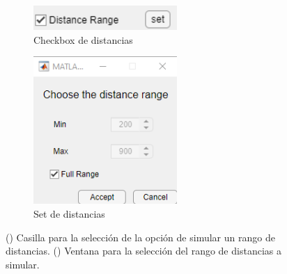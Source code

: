 		\begin{figure}[H]%
		\begin{subfigure}[b]{0.48\textwidth}
			\centering
				\includegraphics[width=0.6\textwidth]{figuras/Procedimiento_Simulaciones/Radiacion/check_distances2.png}
			\caption{Checkbox de distancias}
			\label{fig:check_distances2}
		\end{subfigure}
		\hfill
		\begin{subfigure}[b]{0.48\textwidth}
			\centering
				\includegraphics[width=0.6\textwidth]{figuras/Procedimiento_Simulaciones/Radiacion/set_distances_fullrange.png}
			\caption{Set de distancias}
			\label{fig:set_distances2}
		\end{subfigure}
		\caption{() Casilla para la selección de la opción de simular un rango de distancias. () Ventana para la selección del rango de distancias a simular.}%
		\label{fig:checkboxes2}%
		\end{figure}
